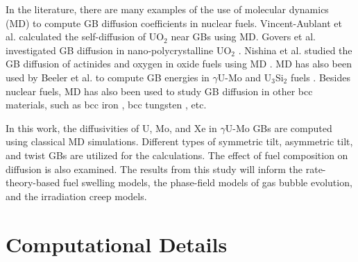 \documentclass{elsarticle}
\providecommand{\DIFadd}[1]{{\protect\color{blue} \sf #1}} %
\providecommand{\DIFdel}[1]{}
\providecommand{\DIFaddbegin}{} %
\providecommand{\DIFaddend}{} %
\providecommand{\DIFdelbegin}{} %
\providecommand{\DIFdelend}{} %
\begin{document}
In the literature, there are many examples of the use of molecular dynamics (MD) to compute GB diffusion coefficients in nuclear fuels. Vincent-Aublant et al. \cite{vincent2009} calculated the self-diffusion of UO$_2$ near GBs using MD. Govers et al. investigated GB diffusion in nano-polycrystalline UO$_2$ \cite{govers2013}. Nishina et al. studied the GB diffusion of actinides and oxygen in oxide fuels using MD \cite{nishina2011}. MD has also been used by Beeler et al. to compute GB energies in $\gamma$U-Mo and U$_3$Si$_2$ fuels \cite{beeler2018, beeler2019}. \DIFdelbegin \DIFdel{Apart from }\DIFdelend \DIFaddbegin \DIFadd{Besides }\DIFaddend nuclear fuels, MD has also been used to study GB diffusion in other bcc materials, such as bcc iron \cite{yang2018}, bcc tungsten \cite{fu2021}, etc.

In this work, the diffusivities of U, Mo, and Xe in $\gamma$U-Mo GBs are computed using classical MD simulations. Different types of symmetric tilt, asymmetric tilt, and twist GBs are utilized for the calculations. The effect of fuel composition on diffusion is also examined. The results from this study will inform the rate-theory-based \DIFdelbegin \DIFdel{fission gas }\DIFdelend \DIFaddbegin \DIFadd{fuel }\DIFaddend swelling models, \DIFaddbegin \DIFadd{the }\DIFaddend phase-field models of gas bubble evolution, and \DIFaddbegin \DIFadd{the }\DIFaddend irradiation creep models.


\section{Computational Details}
\end{document}
